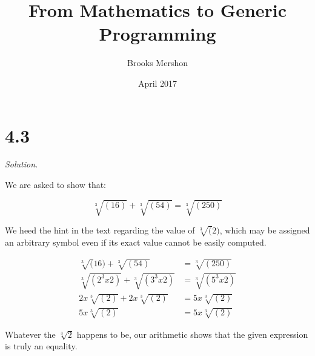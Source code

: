 \documentclass{article}
\title{From Mathematics to Generic Programming}
\author{Brooks Mershon}
\date{April 2017}
\begin{document}
\maketitle

\section*{4.3}


\textit{Solution.}

\bigskip

We are asked to show that:

$$ \sqrt[3]{(16)} + \sqrt[3]{(54)} = \sqrt[3]{(250)}$$

We heed the hint in the text regarding the value of $\sqrt[3](2)$, which may be assigned an arbitrary symbol even if its exact value cannot be easily computed.

\begin{align*}
\sqrt[3](16) + \sqrt[3]{(54)} &= \sqrt[3]{(250)} \\
\sqrt[3]{(2^3 x 2)} + \sqrt[3]{(3^3 x 2)} &= \sqrt[3]{(5^3 x 2)} \\
2 x \sqrt[3]{(2)} + 2 x \sqrt[3]{(2)} &= 5 x \sqrt[3]{(2)} \\
5 x \sqrt[3]{(2)} &= 5 x \sqrt[3]{(2)}
\end{align*}

Whatever the $\sqrt[3]{2}$ happens to be, our arithmetic shows that the given expression is truly an equality.
\end{document}
